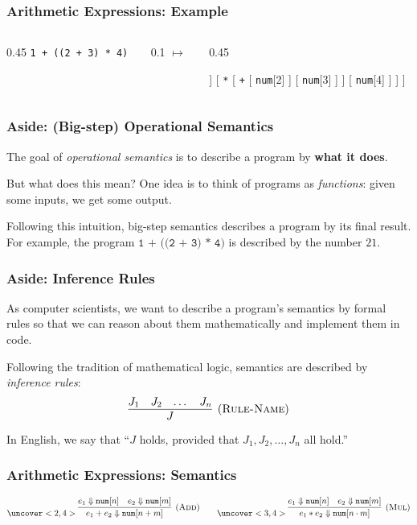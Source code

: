 \documentclass{beamer}
\newcommand{\num}[1]{\texttt{num}[#1]}
\begin{document}
\begin{frame}
	\frametitle{Arithmetic Expressions: Example}

	\begin{columns}
		\begin{column}{0.45\textwidth}
			\centering
			\texttt{1 + ((2 + 3) * 4)}
		\end{column}
		\begin{column}{0.1\textwidth}
			\centering
			$\longmapsto$
		\end{column}
		\begin{column}{0.45\textwidth}
			\centering
			\begin{forest}
				[
					\texttt{+}
					[
						\num{1}
					]
					[
						\texttt{*}
						[
							\texttt{+}
							[
								\num{2}
							]
							[
								\num{3}
							]
						]
						[
							\num{4}
						]
					]
				]
			\end{forest}
		\end{column}
	\end{columns}
\end{frame}

\begin{frame}
	\frametitle{Aside: (Big-step) Operational Semantics}

	The goal of \emph{operational semantics} is to describe a program by \textbf{what it does}.

	But what does this mean?
	One idea is to think of programs as \emph{functions}:
	given some inputs, we get some output.

	Following this intuition, big-step semantics describes a program by its final result.
	For example, the program $\texttt{1 + ((2 + 3) * 4)}$ is described by the number $21$.
\end{frame}

\begin{frame}
	\frametitle{Aside: Inference Rules}

	As computer scientists, we want to describe a program's semantics by formal rules so that we can reason about them mathematically and implement them in code.

	Following the tradition of mathematical logic, semantics are described by \emph{inference rules}:
	\[
		\infer[(\textsc{Rule-Name})]
		{
			J
		}
		{
			J_1 & J_2 & \dots & J_n
		}
	\]
	In English, we say that ``$J$ holds, provided that $J_1, J_2, \dots, J_n$ all hold.''
\end{frame}

\begin{frame}
	\frametitle{Arithmetic Expressions: Semantics}

	\uncover<1,4>{\[
			\infer[(\textsc{Const})]
			{
				\num{n} \Downarrow \num{n}
			}
			{}
		\]}
	\vspace{.5em}
	\[
		\uncover<2,4>{\infer[(\textsc{Add})]
			{
				e_1 + e_2 \Downarrow \num{n + m}
			}
			{
				e_1 \Downarrow \num{n} & e_2 \Downarrow \num{m}
			}}
		\qquad
		\uncover<3,4>{\infer[(\textsc{Mul})]
			{
				e_1 * e_2 \Downarrow \num{n \cdot m}
			}
			{
				e_1 \Downarrow \num{n} & e_2 \Downarrow \num{m}
			}}
	\]
\end{frame}
\end{document}
